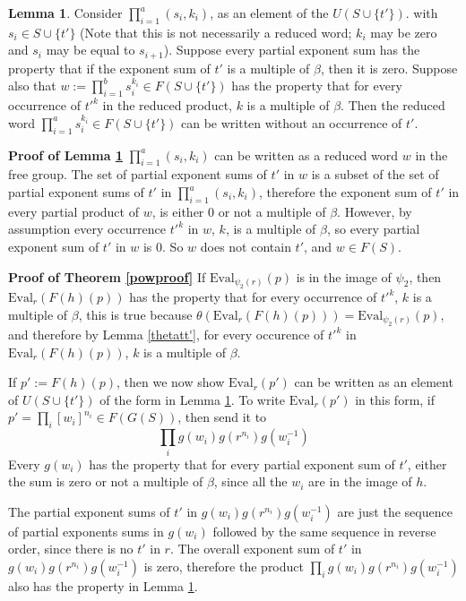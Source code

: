 \documentclass[12pt]{article} %
\theoremstyle{definition}
\theoremstyle{definition}
\theoremstyle{definition}
\newtheorem{lemma}[thm]{Lemma}
\theoremstyle{definition}
\begin{document}
\begin{lemma}\label{powproof1}
  Consider $\prod_{i = 1}^a (s_i, k_i)$, as an element of the $U(S \cup \{t' \})$.
  with $s_i \in S \cup \{t'\}$ (Note that this is not necessarily a reduced
  word; $k_i$ may be zero and $s_i$ may be equal to $s_{i+1}$).
  Suppose every partial exponent sum has the property that if the exponent sum of
  $t'$ is a multiple of $\beta$, then it is zero. Suppose also that
  $w := \prod_{i = 1}^b s_i^{k_i} \in F(S \cup \{t'\})$ has the
  property that for every occurrence of $t'^k$ in the reduced product,
  $k$ is a multiple of $\beta$. Then the reduced word
  $\prod_{i = 1}^a s_i^{k_i} \in F(S \cup \{t'\})$
  can be written without an occurrence of $t'$.
\end{lemma}

\textbf{Proof of Lemma \ref{powproof1}}
$\prod_{i = 1}^a (s_i, k_i)$ can be written as a reduced word $w$ in the free group.
The set of partial exponent sums of $t'$ in $w$
is a subset of the set of partial exponent sums of $t'$ in $\prod_{i = 1}^a (s_i, k_i)$,
therefore the exponent sum of $t'$ in every partial product of $w$, is
either $0$ or not a multiple of $\beta$.
However, by assumption every occurrence $t'^k$ in $w$, $k$,
is a multiple of $\beta$, so every partial exponent sum of $t'$ in $w$ is $0$.
So $w$ does not contain $t'$, and $w \in F(S)$.

\textbf{Proof of Theorem \ref{powproof}} \newline
If $\text{Eval}_{\psi_2(r)}(p)$ is in the image of $\psi_2$, then
$\text{Eval}_{r}(F(h)(p))$ has the property
that for every occurrence of $t'^k$, $k$ is a multiple of $\beta$,
this is true because $\theta(\text{Eval}_{r}(F(h)(p))) =
\text{Eval}_{\psi_2(r)}(p)$, and therefore by Lemma \ref{thetatt'},
for every occurence of $t'^k$ in $\text{Eval}_{r}(F(h)(p))$, $k$
is a multiple of $\beta$.

If $p' := F(h)(p)$,
then we now show $\text{Eval}_{r}(p')$ can be written as an element of $U(S \cup \{t'\})$ of the form in
Lemma \ref{powproof1}.
To write $\text{Eval}_{r}(p')$ in this
form, if $p' = \prod_i \left[w_i\right]^{n_i} \in F(G(S))$, then send it to
\begin{equation} \label{eq:bigprod}
  \prod_i g(w_i)g(r^{n_i})g(w_i^{-1})
\end{equation}
Every $g(w_i)$ has the property that for every partial exponent sum of $t'$, either
the sum is zero or not a multiple of $\beta$, since all the $w_i$ are in the image of $h$.

The partial exponent sums of $t'$ in $g(w_i)g(r^{n_i})g(w_i^{-1})$ are just
the sequence of partial exponents sums in $g(w_i)$ followed by the same sequence in reverse
order, since there is no $t'$ in $r$. The overall exponent sum
of $t'$ in $g(w_i)g(r^{n_i})g(w_i^{-1})$ is zero, therefore the product
$\prod_i g(w_i)g(r^{n_i})g(w_i^{-1})$ also has the property in Lemma \ref{powproof1}.
\end{document}
